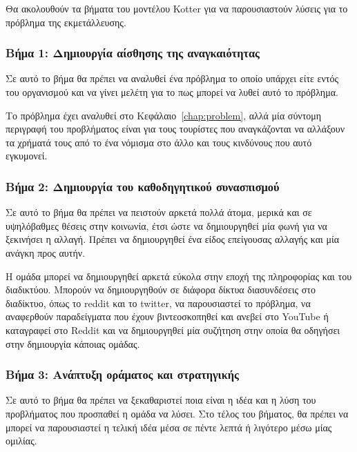 Θα ακολουθούν τα βήματα του μοντέλου Kotter για να παρουσιαστούν λύσεις για το πρόβλημα της εκμετάλλευσης.

\subsubsection{Βήμα 1: Δημιουργία αίσθησης της αναγκαιότητας}

\begin{problem}
  Σε αυτό το βήμα θα πρέπει να αναλυθεί ένα πρόβλημα το οποίο υπάρχει είτε εντός του οργανισμού και να γίνει μελέτη για το πως μπορεί να λυθεί αυτό το πρόβλημα.
\end{problem}

Το πρόβλημα έχει αναλυθεί στο Κεφάλαιο~\ref{chap:problem}, αλλά μία σύντομη περιγραφή του προβλήματος είναι για τους τουρίστες που αναγκάζονται να αλλάξουν τα χρήματά τους από το ένα νόμισμα στο άλλο και τους κινδύνους που αυτό εγκυμονεί.

\subsubsection{Βήμα 2: Δημιουργία του καθοδηγητικού συνασπισμού}

\begin{problem}
  Σε αυτό το βήμα θα πρέπει να πειστούν αρκετά πολλά άτομα, μερικά και σε υψηλόβαθμες θέσεις στην κοινωνία, έτσι ώστε να δημιουργηθεί μία φωνή για να ξεκινήσει η αλλαγή. Πρέπει να δημιουργηθεί ένα είδος επείγουσας αλλαγής και μία ανάγκη προς αυτήν.
\end{problem}

Η ομάδα μπορεί να δημιουργηθεί αρκετά εύκολα στην εποχή της πληροφορίας και του διαδικτύου. Μπορούν να δημιουργηθούν σε διάφορα δίκτυα διασυνδέσεις στο διαδίκτυο, όπως το reddit και το twitter, να παρουσιαστεί το πρόβλημα, να αναφερθούν παραδείγματα που έχουν βιντεοσκοπηθεί και ανεβεί στο YouTube ή καταγραφεί στο Reddit και να δημιουργηθεί μία συζήτηση στην οποία θα οδηγήσει στην δημιουργία κάποιας ομάδας.

\subsubsection{Βήμα 3: Ανάπτυξη οράματος και στρατηγικής}

\begin{problem}
  Σε αυτό το βήμα θα πρέπει να ξεκαθαριστεί ποια είναι η ιδέα και η λύση του προβλήματος που προσπαθεί η ομάδα να λύσει. Στο τέλος του βήματος, θα πρέπει να μπορεί να παρουσιαστεί η τελική ιδέα μέσα σε πέντε λεπτά ή λιγότερο μέσω μίας ομιλίας.
\end{problem}

